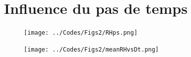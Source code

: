 \documentclass[10pt]{beamer}
\begin{document}
\section*{Influence du pas de temps}

\begin{frame}{\secname}

    \begin{figure}[hbtp]
        \centering
        \texttt{[image: ../Codes/Figs2/RHps.png]}
    \end{figure}
    
\end{frame}

\begin{frame}{\secname}
    \begin{figure}[hbtp]
        \centering
        \texttt{[image: ../Codes/Figs2/meanRHvsDt.png]}
    \end{figure}
\end{frame}

\end{document}
